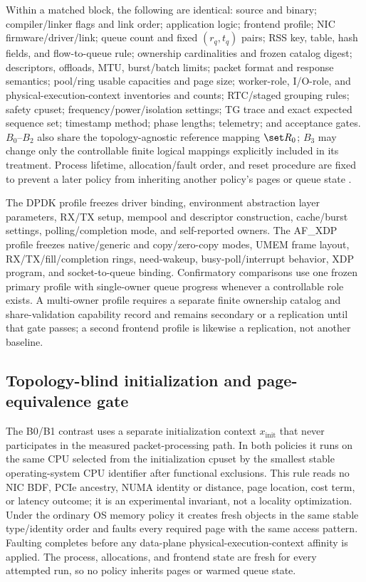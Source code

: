 Within a matched block, the following are identical: source and binary; compiler/linker flags and link order; application logic; frontend profile; NIC firmware/driver/link; queue count and fixed $(r_q,t_q)$ pairs; RSS key, table, hash fields, and flow-to-queue rule; ownership cardinalities and frozen catalog digest; descriptors, offloads, MTU, burst/batch limits; packet format and response semantics; pool/ring usable capacities and page size; worker-role, I/O-role, and physical-execution-context inventories and counts; RTC/staged grouping rules; safety cpuset; frequency/power/isolation settings; TG trace and exact expected sequence set; timestamp method; phase lengths; telemetry; and acceptance gates. $B_0$--$B_2$ also share the topology-agnostic reference mapping $\set R_0$; $B_3$ may change only the controllable finite logical mappings explicitly included in its treatment. Process lifetime, allocation/fault order, and reset procedure are fixed to prevent a later policy from inheriting another policy's pages or queue state \cite{mytkowicz2009wrongdata}.

The DPDK profile freezes driver binding, environment abstraction layer parameters, RX/TX setup, mempool and descriptor construction, cache/burst settings, polling/completion mode, and self-reported owners. The AF\_XDP profile freezes native/generic and copy/zero-copy modes, UMEM frame layout, RX/TX/fill/completion rings, need-wakeup, busy-poll/interrupt behavior, XDP program, and socket-to-queue binding. Confirmatory comparisons use one frozen primary profile with single-owner queue progress whenever a controllable role exists. A multi-owner profile requires a separate finite ownership catalog and share-validation capability record and remains secondary or a replication until that gate passes; a second frontend profile is likewise a replication, not another baseline.

\subsection{Topology-blind initialization and page-equivalence gate}

The B0/B1 contrast uses a separate initialization context $x_{\mathrm{init}}$ that never participates in the measured packet-processing path. In both policies it runs on the same CPU selected from the initialization cpuset by the smallest stable operating-system CPU identifier after functional exclusions. This rule reads no NIC BDF, PCIe ancestry, NUMA identity or distance, page location, cost term, or latency outcome; it is an experimental invariant, not a locality optimization. Under the ordinary OS memory policy it creates fresh objects in the same stable type/identity order and faults every required page with the same access pattern. Faulting completes before any data-plane physical-execution-context affinity is applied. The process, allocations, and frontend state are fresh for every attempted run, so no policy inherits pages or warmed queue state.

